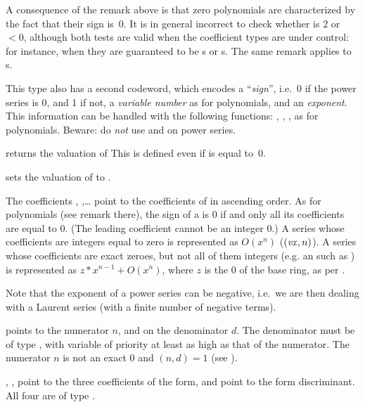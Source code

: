  A consequence of the remark above is that zero polynomials
are characterized by the fact that their sign is~0. It is in general
incorrect to check whether  is $2$ or  $< 0$,
although both tests are valid when the coefficient types are under control:
for instance, when they are guaranteed to be s or s.
The same remark applies to s.

This type also has a second codeword, which
encodes a ``\emph{sign}'', i.e.~0 if the power series is 0, and 1 if not, a
\emph{variable number} as for polynomials, and an \emph{exponent}. This
information can be handled with the following functions: ,
, ,  as for polynomials.
Beware: do \emph{not} use  and  on power series.

 returns the valuation of 
This is defined even if  is equal to~0.

 sets the valuation of 
to .

The coefficients , ,\dots {} point to
the coefficients of  in ascending order. As for polynomials
(see remark there), the sign of a  is $0$ if and only all
its coefficients are equal to $0$. (The leading coefficient cannot be an
integer $0$.) A series whose coefficients are integers equal to zero
is represented as $O(x^n)$ ($(\hbox{\it vx\/},n)$).
A series whose coefficients are exact zeroes, but not all of
them integers  (e.g. an  such as ) is
represented as $z*x^{n-1} +O(x^n)$, where $z$ is the $0$ of the
base ring, as per .

Note that the exponent of a power series can be negative, i.e.~we are
then dealing with a Laurent series (with a finite number of negative
terms).

%
  points to the
numerator $n$, and  on the denominator $d$. The denominator must be
of type , with variable of priority at least as high as that of the
numerator. The numerator $n$ is not an exact $0$ and $(n,d) = 1$ (see
).

%
 , ,
 point to the three coefficients of the form, and  point to
the form discriminant. All four are of type .

